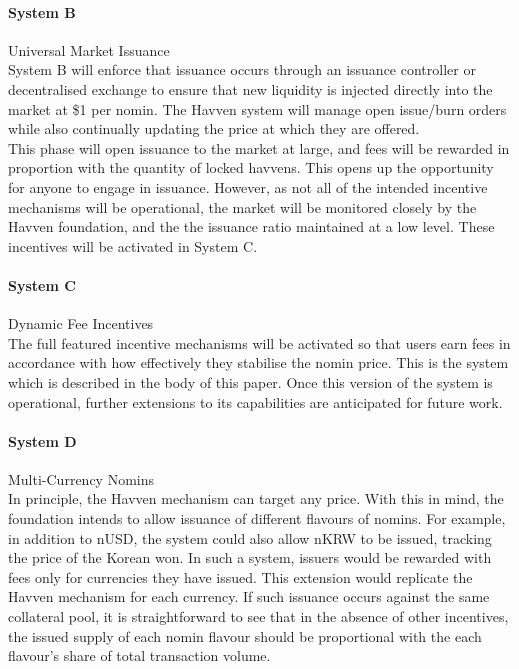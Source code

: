 \paragraph{System B} Universal Market Issuance \\

\noindent System B will enforce that issuance occurs through an issuance controller or
decentralised exchange to ensure that new liquidity is injected directly
into the market at \$1 per nomin. The Havven system will manage open
issue/burn orders while also continually updating the price at which they are
offered. \\

\noindent This phase will open issuance to the market at large, and fees will be rewarded
in proportion with the quantity of locked havvens. This opens up the opportunity
for anyone to engage in issuance. However, as not all of the intended incentive
mechanisms will be operational, the market will be monitored closely by the Havven
foundation, and the the issuance ratio maintained at a low level. These incentives will
be activated in System C. \\


\paragraph{System C} Dynamic Fee Incentives \\

\noindent The full featured incentive mechanisms will be activated so that users earn fees
in accordance with how effectively they stabilise the nomin price. This is the
system which is described in the body of this paper. Once this version of the system
is operational, further extensions to its capabilities are anticipated for future work. \\


\paragraph{System D} Multi-Currency Nomins \\

\noindent In principle, the Havven mechanism can target any price. 
With this in mind, the foundation intends to allow issuance
of different flavours of nomins. For example, in addition to 
nUSD, the system could also allow nKRW to be issued, tracking
the price of the Korean won. In such a system, issuers would be
rewarded with fees only for currencies they have issued. This extension
would replicate the Havven mechanism for each currency. 
If such issuance occurs against the same collateral pool, it is
straightforward to see that in the absence of other incentives,
the issued supply of each nomin flavour should be proportional with the
each flavour's share of total transaction volume. \\

